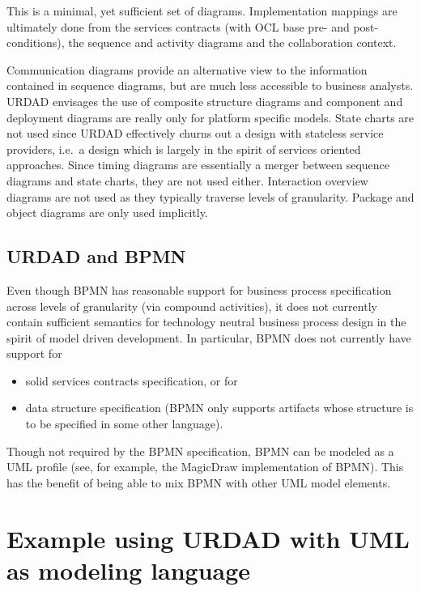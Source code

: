 \documentclass[reviewcopy]{elsart}
\begin{document}
This is a minimal, yet sufficient set of diagrams. Implementation mappings are ultimately done from the services contracts (with OCL
base pre- and post-conditions), the sequence and activity diagrams and the collaboration
context.

Communication diagrams provide an alternative view to the information contained in sequence diagrams, but are much less accessible to business analysts.
URDAD envisages the use of composite structure diagrams and component and deployment diagrams are really only for platform specific models. State charts are not used since URDAD effectively churns out a design with stateless service providers, i.e.\ a design which is largely in the spirit of services oriented approaches. Since timing diagrams are essentially a merger between
sequence diagrams and state charts, they are not used either. Interaction overview diagrams are not used as they typically traverse levels of granularity. Package and object diagrams are only
used implicitly.


\subsection{URDAD and BPMN}

Even though BPMN has reasonable support for business process specification
across levels of granularity (via compound activities), it does not currently
contain sufficient semantics for technology neutral business process design in
the spirit of model driven development. In particular, BPMN does not currently
have support for

\begin{itemize}
  \item solid services contracts specification, or for

  \item data structure specification (BPMN only supports artifacts whose
	structure is to be specified in some other language).
\end{itemize}

Though not required by the BPMN specification, BPMN can be modeled as a UML profile
(see, for example, the MagicDraw implementation of BPMN).
This has the benefit of being able to mix BPMN with other UML model elements.


\section{Example using URDAD with UML as modeling language}
\end{document}

